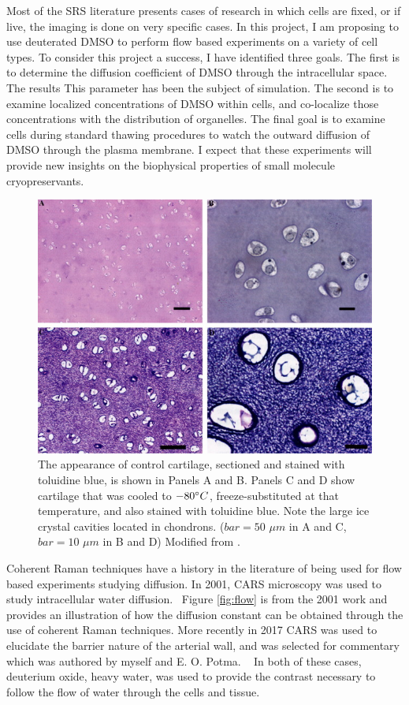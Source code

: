    Most of the SRS literature presents cases of research in which cells are fixed, or if live, the imaging is done on very specific cases.  In this project, I am proposing to use deuterated DMSO to perform flow based experiments on a variety of cell types.  To consider this project a success, I have identified three goals.  The first is to determine the diffusion coefficient of DMSO through the intracellular space. The results This parameter has been the subject of simulation.\cite{LEEKUMJORN20061751}  The second is to examine localized concentrations of DMSO within cells, and co-localize those concentrations with the distribution of organelles.  The final goal is to examine cells during standard thawing procedures to watch the outward diffusion of DMSO through the plasma membrane.  I expect that these experiments will provide new insights on the biophysical properties of small molecule cryopreservants. 
   
   \begin{figure}[h]
       \centering
       \includegraphics[width=.6\linewidth]{Figures/crystals.jpg}
       \caption{The appearance of control cartilage, sectioned and stained with toluidine blue, is shown in Panels A and B. Panels C and D show cartilage that was cooled to $ -80  \degree C$, freeze-substituted at that temperature, and also stained with toluidine blue. Note the large ice crystal cavities located in chondrons. ($bar = 50$ $\mu m$ in A and C, $bar = 10$ $\mu m$ in B and D) Modified from \cite{PEGG2010S36}.}
       \label{fig:crystal}
   \end{figure}
   
   Coherent Raman techniques have a history in the literature of being used for flow based experiments studying diffusion.  In 2001, CARS microscopy was used to study intracellular water diffusion.~\cite{Potma:2001aa}  Figure \ref{fig:flow} is from the 2001 work and provides an illustration of how the diffusion constant can be obtained through the use of coherent Raman techniques.  More recently in 2017 CARS was used to elucidate the barrier nature of the arterial wall, and was selected for commentary which was authored by myself and E. O. Potma. ~\cite{Lucotte4805, Prince201704101}  In both of these cases, deuterium oxide, heavy water, was used to provide the contrast necessary to follow the flow of water through the cells and tissue.  
   
